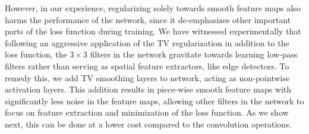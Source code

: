 \documentclass[reqno]{amsart}
\begin{document}
However, in our experience, regularizing solely towards smooth feature maps also harms the performance of the network, since it de-emphasizes other important parts of the loss function during training. We have witnessed experimentally that following an aggressive application of the TV regularization in addition to the loss function, the $3\times3$ filters in the network gravitate towards learning low-pass filters rather than serving as spatial feature extractors, like edge detectors. To remedy this, we add TV smoothing layers to network, acting as non-pointwise activation layers. This addition results in piece-wise smooth feature maps with significantly less noise in the feature maps, allowing other filters in the network to focus on feature extraction and minimization of the loss function. As we show next, this can be done at a  lower cost compared to the convolution operations.
  
\end{document}
